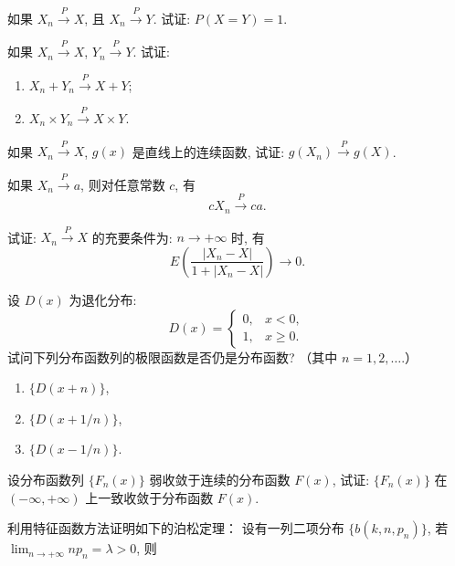 \begin{xiti}
    \item 如果 $ X_n \stackrel{P}{\to} X $, 且 $ X_n \stackrel{P}{\to} Y $. 试证: $ P ( X = Y ) = 1 $.
    \item 如果 $ X_n \stackrel{P}{\to} X $, $ Y_n \stackrel{P}{\to} Y $. 试证:
    \begin{enumerate}
        \item $ X_n + Y_n \stackrel{P}{\to} X + Y $;
        \item $ X_n \times Y_n \stackrel{P}{\to} X \times Y $.
    \end{enumerate}
    \item 如果 $ X_n \stackrel{P}{\to} X $, $ g (x) $ 是直线上的连续函数, 试证: $ g ( X_n ) \stackrel{P}{\to} g (X) $.
    \item 如果 $ X_n \stackrel{P}{\to} a $, 则对任意常数 $ c $, 有
    \begin{equation*}
        c X_n \stackrel{P}{\to} ca.
    \end{equation*}
    \item 试证: $ X_n \stackrel{P}{\to} X $ 的充要条件为: $ n \to +\infty $ 时, 有
    \begin{equation*}
        E \left( \frac{\lvert X_n - X \rvert}{1 + \lvert X_n - X \rvert} \right) \to 0.
    \end{equation*}
    \item 设 $ D (x) $ 为退化分布:
    \begin{equation*}
        D (x) =
        \begin{cases}
            0, & x < 0,\\
            1, & x \geq 0.
        \end{cases}
    \end{equation*}
    试问下列分布函数列的极限函数是否仍是分布函数? （其中 $ n = 1, 2, \dotsc $.）
    \begin{enumerate}
        \item $ \{ D ( x + n ) \} $,
        \item $ \{ D ( x + 1/n ) \} $,
        \item $ \{ D ( x - 1/n ) \} $.
    \end{enumerate}
    \item 设分布函数列 $ \{ F_n (x) \} $ 弱收敛于连续的分布函数 $ F (x) $, 试证: $ \{ F_n (x) \} $ 在 $ ( -\infty, +\infty ) $ 上一致收敛于分布函数 $ F (x) $.
    \item 利用特征函数方法证明如下的泊松定理： 设有一列二项分布 $ \{ b ( k, n, p_n ) \} $, 若 $ \lim_{n \to +\infty} n p_n = \lambda > 0 $, 则

\end{xiti}
